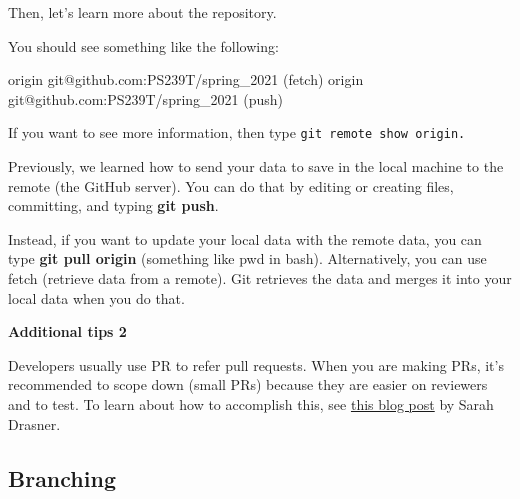 \documentclass[
  letterpaper,
  DIV=11,
  numbers=noendperiod]{scrreprt}
\newenvironment{Shaded}{\begin{snugshade}}{\end{snugshade}}
\newcommand{\AttributeTok}[1]{\textcolor[rgb]{0.40,0.45,0.13}{#1}}
\newcommand{\ErrorTok}[1]{\textcolor[rgb]{0.68,0.00,0.00}{#1}}
\newcommand{\ExtensionTok}[1]{\textcolor[rgb]{0.00,0.23,0.31}{#1}}
\newcommand{\KeywordTok}[1]{\textcolor[rgb]{0.00,0.23,0.31}{#1}}
\newcommand{\NormalTok}[1]{\textcolor[rgb]{0.00,0.23,0.31}{#1}}
\begin{document}
Then, let's learn more about the repository.

\begin{Shaded}
\end{Shaded}

You should see something like the following:

\begin{Shaded}
\begin{Highlighting}[]
\ExtensionTok{origin}\NormalTok{  git@github.com:PS239T/spring\_2021 }\ErrorTok{(}\ExtensionTok{fetch}\KeywordTok{)}
\ExtensionTok{origin}\NormalTok{  git@github.com:PS239T/spring\_2021 }\ErrorTok{(}\ExtensionTok{push}\KeywordTok{)}
\end{Highlighting}
\end{Shaded}

If you want to see more information, then type
\texttt{git\ remote\ show\ origin.}

Previously, we learned how to send your data to save in the local
machine to the remote (the GitHub server). You can do that by editing or
creating files, committing, and typing \textbf{git push}.

Instead, if you want to update your local data with the remote data, you
can type \textbf{git pull origin} (something like pwd in bash).
Alternatively, you can use fetch (retrieve data from a remote). Git
retrieves the data and merges it into your local data when you do that.

\begin{Shaded}
\end{Shaded}

\textbf{Additional tips 2}

Developers usually use PR to refer pull requests. When you are making
PRs, it's recommended to scope down (small PRs) because they are easier
on reviewers and to test. To learn about how to accomplish this, see
\href{https://www.netlify.com/blog/2020/03/31/how-to-scope-down-prs/}{this
blog post} by Sarah Drasner.

\hypertarget{branching}{%
\subsection*{Branching}\label{branching}}
\end{document}

